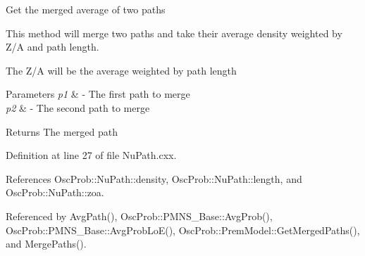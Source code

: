 Get the merged average of two paths

This method will merge two paths and take their average density weighted by Z/A and path length.

The Z/A will be the average weighted by path length


\begin{DoxyParams}{Parameters}
{\em p1} & -\/ The first path to merge \\
\hline
{\em p2} & -\/ The second path to merge \\
\hline
\end{DoxyParams}
\begin{DoxyReturn}{Returns}
The merged path 
\end{DoxyReturn}


Definition at line 27 of file Nu\+Path.\+cxx.



References Osc\+Prob\+::\+Nu\+Path\+::density, Osc\+Prob\+::\+Nu\+Path\+::length, and Osc\+Prob\+::\+Nu\+Path\+::zoa.



Referenced by Avg\+Path(), Osc\+Prob\+::\+P\+M\+N\+S\+\_\+\+Base\+::\+Avg\+Prob(), Osc\+Prob\+::\+P\+M\+N\+S\+\_\+\+Base\+::\+Avg\+Prob\+Lo\+E(), Osc\+Prob\+::\+Prem\+Model\+::\+Get\+Merged\+Paths(), and Merge\+Paths().


